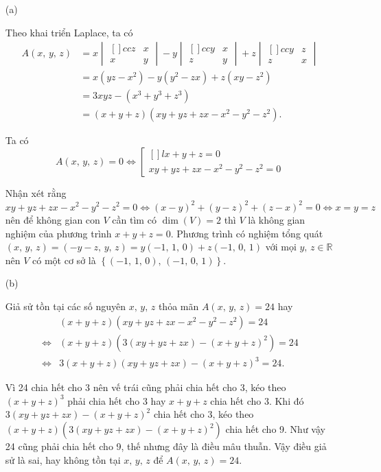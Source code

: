 \begin{enumerate}
    \item[(a)] {Theo khai triển Laplace, ta có 
    \begin{align*}
        A(x,\,y,\,z) 
        & = x\begin{vmatrix}[]{cc}
            z & x \\
            x & y
        \end{vmatrix} - y\begin{vmatrix}[]{cc}
            y & x \\
            z & y
        \end{vmatrix} + z\begin{vmatrix}[]{cc}
            y & z \\
            z & x
        \end{vmatrix} \\
        & = x(yz - x^2) - y(y^2 - zx) + z(xy - z^2) \\
        & = 3xyz - (x^3+y^3+z^3) \\
        & = (x + y + z)(xy + yz + zx - x^2 - y^2 - z^2).
    \end{align*}

    Ta có $$A(x,\,y,\,z) = 0 \iff \left[\begin{matrix}[]{l}
        x + y + z = 0 \\ xy + yz + zx - x^2 - y^2 - z^2 = 0
    \end{matrix} \right.$$

    Nhận xét rằng $xy + yz + zx - x^2 - y^2 - z^2 = 0\iff (x-y)^2 + (y-z)^2 + (z-x)^2 = 0 \iff x = y = z$ nên để không gian con $V$ cần tìm có $\dim(V) = 2$ thì $V$ là không gian nghiệm của phương trình $x + y + z = 0$. Phương trình có nghiệm tổng quát $(x,\,y,\,z) = (-y-z,\,y,\,z) = y(-1,\,1,\,0) + z(-1,\,0,\,1)$ với mọi $y,\,z \in \mathbb{R}$ nên $V$ có một cơ sở là $\left\{(-1,\,1,\,0),\,(-1,\,0,\,1)\right\}$.
    }
    \item[(b)] {Giả sử tồn tại các số nguyên $x,\,y,\,z$ thỏa mãn $A(x,\,y,\,z) = 24$ hay 
    \begin{align*}
        & (x + y + z)(xy + yz + zx - x^2 - y^2 - z^2) = 24 \\
        \iff & (x + y + z)\left(3(xy+yz+zx) - (x+y+z)^2\right) = 24 \\
        \iff & 3(x+y+z)(xy+yz+zx) - (x+y+z)^3 = 24.
    \end{align*}

    Vì 24 chia hết cho 3 nên vế trái cũng phải chia hết cho 3, kéo theo $(x+y+z)^3$ phải chia hết cho 3 hay $x+y+z$ chia hết cho 3. Khi đó $3(xy+yz+zx)-(x+y+z)^2$ chia hết cho 3, kéo theo $(x + y + z)\left(3(xy+yz+zx) - (x+y+z)^2\right)$ chia hết cho 9. Như vậy 24 cũng phải chia hết cho 9, thế nhưng đây là điều mâu thuẫn. Vậy điều giả sử là sai, hay không tồn tại $x,\,y,\,z$ để $A(x,\,y,\,z) = 24$.
    }
\end{enumerate}

